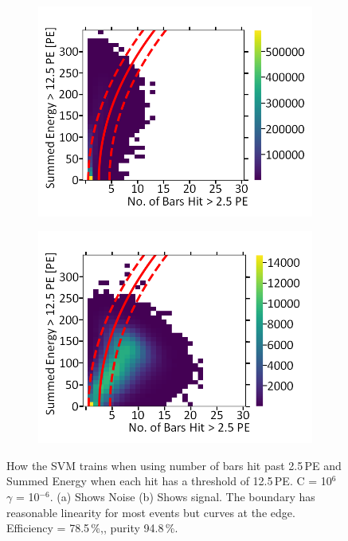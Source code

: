 \begin{figure}[!h]
\centering
\begin{subfigure}{.5\textwidth}
  \centering
  \includegraphics[width=\linewidth]{Appendix1/Figs/Bars1Sum2Noise.png}
  \captionsetup{width=.9\linewidth}
  \caption{}
  \label{subFig:Bars1Sum2N}
\end{subfigure}%
\begin{subfigure}{.5\textwidth}
  \centering
\includegraphics[width=\linewidth]{Appendix1/Figs/Bars1Sum2Signal.png}
  \captionsetup{width=.9\linewidth}
  \caption{}
  \label{subFig:Bars1Sum2S}
\end{subfigure}
\caption{How the SVM trains when using number of bars hit past 2.5\,PE and Summed Energy when each hit has a threshold of 12.5\,PE. C = 10$^6$ $\gamma$ = 10$^{-6}$. (a) Shows Noise (b) Shows signal. The boundary has reasonable linearity for most events but curves at the edge. Efficiency = 78.5\,\%,, purity 94.8\,\%.}
\label{fig:Bars1Sum2SN}
\end{figure}

